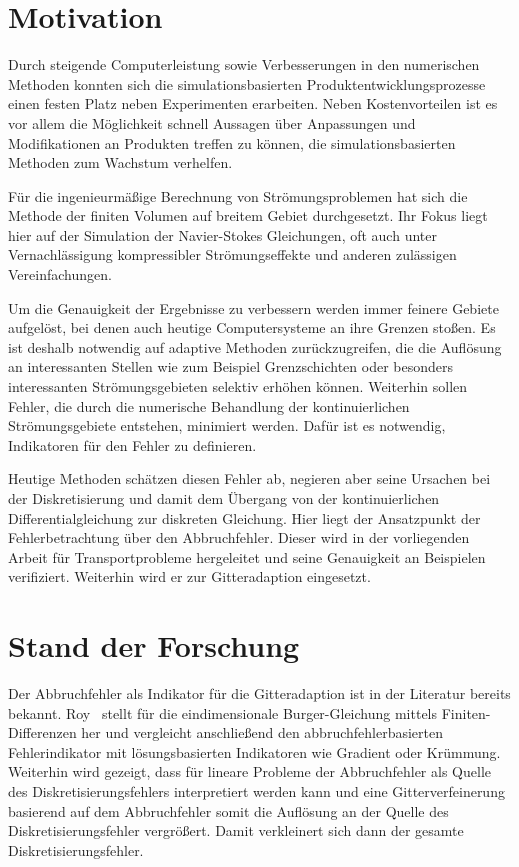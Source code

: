 \section{Motivation}
Durch steigende Computerleistung sowie Verbesserungen in den numerischen Methoden konnten
sich die simulationsbasierten Produktentwicklungsprozesse einen festen Platz neben
Experimenten erarbeiten. Neben Kostenvorteilen ist es vor allem die Möglichkeit
schnell Aussagen über Anpassungen und Modifikationen an Produkten treffen zu können, die
simulationsbasierten Methoden zum Wachstum verhelfen.

Für die ingenieurmäßige Berechnung von Strömungsproblemen hat sich die Methode der
finiten Volumen auf breitem Gebiet durchgesetzt. Ihr Fokus liegt hier auf der Simulation
der Navier-Stokes Gleichungen, oft auch unter Vernachlässigung kompressibler Strömungseffekte und
anderen zulässigen Vereinfachungen.

Um die Genauigkeit der Ergebnisse zu verbessern werden immer feinere Gebiete aufgelöst,
bei denen auch heutige Computersysteme an ihre Grenzen stoßen. Es ist deshalb notwendig
auf adaptive Methoden zurückzugreifen, die die Auflösung an interessanten Stellen wie
zum Beispiel Grenzschichten oder besonders interessanten Strömungsgebieten selektiv erhöhen können.
Weiterhin sollen Fehler, die durch die numerische Behandlung der kontinuierlichen Strömungsgebiete
entstehen, minimiert werden. Dafür ist es notwendig, Indikatoren für den Fehler zu definieren.

Heutige Methoden schätzen diesen Fehler ab, negieren aber seine Ursachen bei der Diskretisierung
und damit dem Übergang von der kontinuierlichen Differentialgleichung zur diskreten Gleichung.
Hier liegt der Ansatzpunkt der Fehlerbetrachtung über den Abbruchfehler. Dieser wird in der
vorliegenden Arbeit für Transportprobleme hergeleitet und seine Genauigkeit an Beispielen
verifiziert. Weiterhin wird er zur Gitteradaption eingesetzt.


\section{Stand der Forschung}

Der Abbruchfehler als Indikator für die Gitteradaption ist in der Literatur bereits bekannt.
Roy~\cite{roy2} stellt für die eindimensionale Burger-Gleichung mittels
Finiten-Differenzen her und vergleicht anschließend den abbruchfehlerbasierten Fehlerindikator
mit lösungsbasierten Indikatoren wie Gradient oder Krümmung. Weiterhin wird gezeigt,
dass für lineare Probleme der Abbruchfehler
als Quelle des Diskretisierungsfehlers interpretiert werden kann und
eine Gitterverfeinerung basierend auf dem Abbruchfehler
somit die Auflösung an der Quelle des Diskretisierungsfehler vergrößert.
Damit verkleinert sich dann der gesamte Diskretisierungsfehler.

